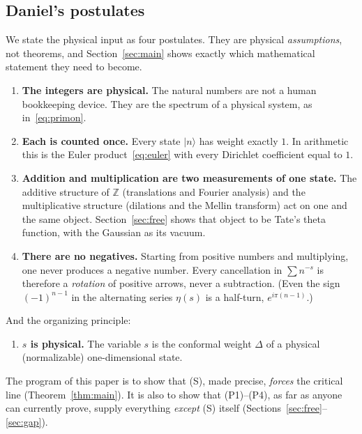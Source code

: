 \documentclass[11pt,a4paper]{article}
\theoremstyle{plain}
\theoremstyle{definition}
\theoremstyle{remark}
\newcommand{\Z}{\mathbb{Z}}
\begin{document}
\subsection{Daniel's postulates}

We state the physical input as four postulates. They are physical
\emph{assumptions}, not theorems, and Section~\ref{sec:main} shows exactly
which mathematical statement they need to become.

\begin{enumerate}[label=\textbf{(P\arabic*)},leftmargin=3em]
\item \textbf{The integers are physical.} The natural numbers are not a
human bookkeeping device. They are the spectrum of a physical system, as
in~\eqref{eq:primon}.
\item \textbf{Each is counted once.} Every state $|n\rangle$ has weight
exactly $1$. In arithmetic this is the Euler product~\eqref{eq:euler} with
every Dirichlet coefficient equal to $1$.
\item \textbf{Addition and multiplication are two measurements of one state.}
The additive structure of $\Z$ (translations and Fourier analysis) and the
multiplicative structure (dilations and the Mellin transform) act on one
and the same object. Section~\ref{sec:free} shows that object to be Tate's
theta function, with the Gaussian as its vacuum.
\item \textbf{There are no negatives.} Starting from positive numbers and
multiplying, one never produces a negative number. Every cancellation in
$\sum n^{-s}$ is therefore a \emph{rotation} of positive arrows, never a
subtraction. (Even the sign $(-1)^{n-1}$ in the alternating series
$\eta(s)$ is a half-turn, $e^{i\pi(n-1)}$.)
\end{enumerate}
\noindent
And the organizing principle:
\begin{enumerate}[label=\textbf{(S)},leftmargin=3em]
\item \textbf{$s$ is physical.} The variable $s$ is the conformal weight
$\Delta$ of a physical (normalizable) one-dimensional state.
\end{enumerate}

The program of this paper is to show that (S), made precise, \emph{forces}
the critical line (Theorem~\ref{thm:main}). It is also to show that
(P1)--(P4), as far as anyone can currently prove, supply everything
\emph{except} (S) itself (Sections~\ref{sec:free}--\ref{sec:gap}).

\end{document}
